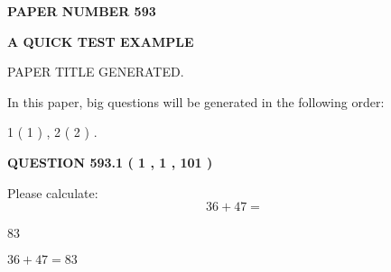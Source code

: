 \documentclass[12pt]{article}
\begin{document}
   
   
   
\newpage 
\setcounter{page}{ 
   593001 } 
   
   
   
   
 {\textbf{ \Large{ PAPER NUMBER  593  }}}
   
   
\vspace{0.2in}
   
   
   
   
   
   
   
   
 \vspace{0.2in}
{\LARGE {\textbf{ A QUICK TEST EXAMPLE}}}
   
   
 PAPER TITLE GENERATED.
   
   
   
\vspace{0.2in}
   
In this paper, big questions will be generated in the following order: 
   
   
   1 ( 1 )
 ,
   2 ( 2 )
 .
  
\vspace{0.2in}
  
{\textbf{\Large{QUESTION
593.1 
 ( 1 , 1 , 101 )
}}}
  
  
 
Please calculate:
\begin{equation}
36 +  %
47 = \nonumber
\end{equation}
 
 
 
\noindent{}
 
 

83
 
 
\noindent{}
 
 

 
 
 
\noindent{}
 
 

$ %
36 +  %
47=   %
83$
 
 
\noindent{}
 
 

 
   
\end{document}
